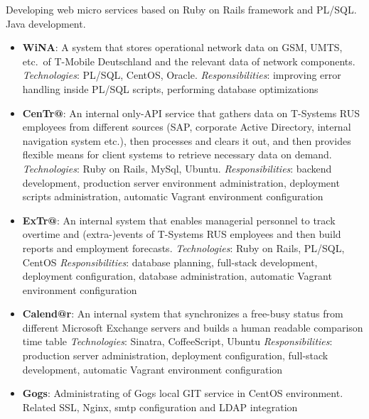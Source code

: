 \documentclass{cv}
\begin{document}
\begin{cvblock}{%
  }

  Developing web micro services based on Ruby on Rails framework and PL/SQL\@.
  Java development.

  \begin{itemize}
    \item \textbf{WiNA}:
      A system that stores operational network data on GSM,
      UMTS, etc.\ of T-Mobile Deutschland and the relevant data of
      network components. \textit{Technologies}: PL/SQL, CentOS, Oracle.
      \textit{Responsibilities}: improving error handling inside PL/SQL scripts,
      performing database optimizations

    \item \textbf{CenTr@}:
      An internal only-API service that gathers data on T-Systems RUS employees
      from different sources (SAP, corporate Active Directory,
      internal navigation system etc.), then processes and clears it out, and
      then provides flexible means for client systems to retrieve necessary
      data on demand. \textit{Technologies}: Ruby on Rails, MySql, Ubuntu.
      \textit{Responsibilities}: backend development, production server
      environment administration, deployment scripts administration,
      automatic Vagrant environment configuration

    \item \textbf{ExTr@}:
      An internal system that enables managerial personnel to track overtime
      and (extra-)events of T-Systems RUS employees and then build reports and
      employment forecasts.
      \textit{Technologies}: Ruby on Rails, PL/SQL, CentOS
      \textit{Responsibilities}: database planning, full-stack development,
      deployment configuration, database administration, automatic Vagrant
      environment configuration

\end{itemize}\end{cvblock}\begin{cvblock}{}\begin{itemize}

    \item \textbf{Calend@r}:
      An internal system that synchronizes a free-busy status from different
      Microsoft Exchange servers and builds a human readable comparison time
      table
      \textit{Technologies}: Sinatra, CoffeeScript, Ubuntu
      \textit{Responsibilities}: production server administration, deployment
      configuration, full-stack development, automatic Vagrant environment
      configuration
    \item \textbf{Gogs}:
      Administrating of Gogs local GIT service in CentOS environment. Related
      SSL, Nginx, smtp configuration and LDAP integration

  \end{itemize}
\end{cvblock}
\end{document}

